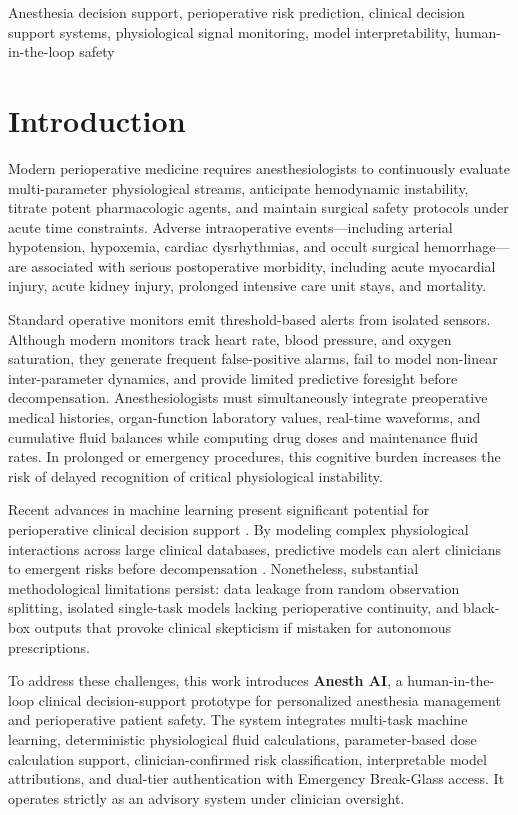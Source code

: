 \documentclass[conference]{IEEEtran}
\begin{document}
\begin{IEEEkeywords}
Anesthesia decision support, perioperative risk prediction, clinical decision support systems, physiological signal monitoring, model interpretability, human-in-the-loop safety
\end{IEEEkeywords}

\section{Introduction}
Modern perioperative medicine requires anesthesiologists to continuously evaluate multi-parameter physiological streams, anticipate hemodynamic instability, titrate potent pharmacologic agents, and maintain surgical safety protocols under acute time constraints. Adverse intraoperative events---including arterial hypotension, hypoxemia, cardiac dysrhythmias, and occult surgical hemorrhage---are associated with serious postoperative morbidity, including acute myocardial injury, acute kidney injury, prolonged intensive care unit stays, and mortality.

Standard operative monitors emit threshold-based alerts from isolated sensors. Although modern monitors track heart rate, blood pressure, and oxygen saturation, they generate frequent false-positive alarms, fail to model non-linear inter-parameter dynamics, and provide limited predictive foresight before decompensation. Anesthesiologists must simultaneously integrate preoperative medical histories, organ-function laboratory values, real-time waveforms, and cumulative fluid balances while computing drug doses and maintenance fluid rates. In prolonged or emergency procedures, this cognitive burden increases the risk of delayed recognition of critical physiological instability.

Recent advances in machine learning present significant potential for perioperative clinical decision support \cite{ref2,ref3}. By modeling complex physiological interactions across large clinical databases, predictive models can alert clinicians to emergent risks before decompensation \cite{ref4,ref5}. Nonetheless, substantial methodological limitations persist: data leakage from random observation splitting, isolated single-task models lacking perioperative continuity, and black-box outputs that provoke clinical skepticism if mistaken for autonomous prescriptions.

To address these challenges, this work introduces \textbf{Anesth AI}, a human-in-the-loop clinical decision-support prototype for personalized anesthesia management and perioperative patient safety. The system integrates multi-task machine learning, deterministic physiological fluid calculations, parameter-based dose calculation support, clinician-confirmed risk classification, interpretable model attributions, and dual-tier authentication with Emergency Break-Glass access. It operates strictly as an advisory system under clinician oversight.
\end{document}

